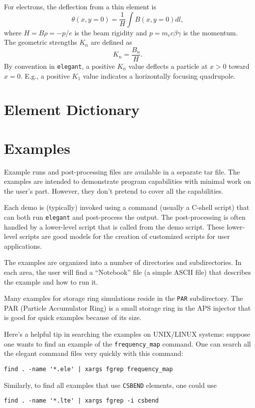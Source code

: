 \documentclass[11pt]{article}
\begin{document}
For electrons, the deflection from a thin element is
\begin{equation}
\theta(x,y=0) = \frac{1}{H} \int B(x,y=0) dl,
\end{equation}
where $H = B\rho = -p/e$ is the beam rigidity and $p=m_e c \beta\gamma$ is the momentum.
The geometric strengths $K_n$ are defined as
\begin{equation}
K_n = \frac{B_n}{H}.
\end{equation}
By convention in {\tt elegant}, a positive $K_n$ value deflects a particle at $x>0$ toward $x=0$.
E.g., a positive $K_1$ value indicates a horizontally focusing quadrupole.

\newpage
\section{Element Dictionary}



%

\newpage
\section{Examples}

Example runs and post-processing files are available in a separate tar file.
The examples are intended to
demonstrate program capabilities with minimal work on the user's part.
However, they don't pretend to cover all the capabilities.

Each demo is (typically) invoked using a command (usually a C-shell
script) that can both run {\tt elegant} and post-process the output.
The post-processing is often handled by a lower-level script that is
called from the demo script.  These lower-level scripts are good
models for the creation of customized scripts for user applications.

The examples are organized into a number of directories and subdirectories.
In each area, the user will find a ``Notebook'' file (a simple ASCII file) that describes 
the example and how to run it.

Many examples for storage ring simulations reside in the {\tt PAR} subdirectory.
The PAR (Particle Accumulator Ring) is a small storage ring in the APS injector
that is good for quick examples because of its size.

Here's a helpful tip in searching the examples on UNIX/LINUX systems: suppose one wants
to find an example of the \verb|frequency_map| command.  One can search all the elegant
command files very quickly with this command:
\begin{verbatim}
find . -name '*.ele' | xargs fgrep frequency_map
\end{verbatim}
Similarly, to find all examples that use \verb|CSBEND| elements, one could use
\begin{verbatim}
find . -name '*.lte' | xargs fgrep -i csbend
\end{verbatim}
\end{document}
